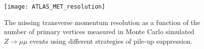 \begin{figure}[ht]
  \centering
  \texttt{[image: ATLAS\_MET\_resolution]}
  \caption[ATLAS missing transverse momentum resolution.]{The missing transverse
    momentum resolution as a function of the number of primary vertices measured
    in Monte Carlo simulated $Z \to \mu\mu$ events using different strategies of
    pile-up suppression.
  }
  \label{fig:impact-param-reso}
\end{figure}
